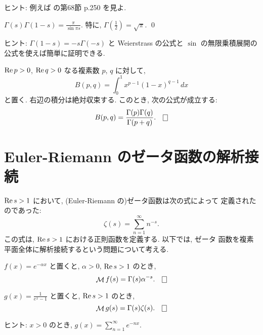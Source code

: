 \documentclass[12pt,twoside]{jarticle}
\begin{document}
\noindent ヒント: 例えば \cite{kaiseki-gairon}の第68節 p.250 を見よ. 

\begin{question}
\label{q:Gamma-and-Sin}
  \(
  \displaystyle
    \Gamma(s)\Gamma(1-s) = \frac{\pi}{\sin \pi s}.
  \)
  \quad
  特に, 
  \(
  \displaystyle
    \Gamma\left( \frac{1}{2} \right) = \sqrt{\pi}.
  \)
  \qed
\end{question}

\noindent ヒント: $\Gamma(1-s)=-s\Gamma(-s)$ と Weierstrass の公式と 
$\sin$ の無限乗積展開の公式を使えば簡単に証明できる.

\begin{question}[ベータ函数との関係]
  $\mathop{\mathrm{Re}}\nolimits p > 0$, $\mathop{\mathrm{Re}}\nolimits q > 0$ なる複素数 $p$, $q$ に対して,
  \[
    B(p,q) = \int_0^1 x^{p-1} (1-x)^{q-1}\,dx
  \]%
と置く. 右辺の積分は絶対収束する. このとき, 次の公式が成立する:
  \[
    B(p,q) = \frac{\Gamma(p)\Gamma(q)}{\Gamma(p+q)}.
  \qed
  \]
\end{question}


\section{Euler-Riemann のゼータ函数の解析接続}

$\mathop{\mathrm{Re}}\nolimits s > 1$ において, (Euler-Riemann の)ゼータ函数は次の式によって
定義されたのであった:
\[
  \zeta(s)
  = \sum_{n=1}^\infty n^{-s}. 
\]%
この式は, $\mathop{\mathrm{Re}}\nolimits s > 1$ における正則函数を定義する. 以下では, ゼータ
函数を複素平面全体に解析接続するという問題について考える.

\begin{question}\label{q:Mellin-exp}
  $f(x) = e^{- \alpha x}$ と置くと,
  $\alpha > 0$, $\mathop{\mathrm{Re}}\nolimits s > 1$ のとき, 
  \[
    \Mellin f(s) = \Gamma(s) \alpha^{-s}.
  \qed
  \]
\end{question}

\begin{question}
  $\displaystyle g(x) = \frac{1}{e^x - 1}$ と置くと,
  $\mathop{\mathrm{Re}}\nolimits s > 1$ のとき, 
  \[
    \Mellin g(s) = \Gamma(s) \zeta(s).
  \qed
  \]
\end{question}

\noindent ヒント: $x > 0$ のとき, $g(x) = \sum_{n=1}^\infty e^{-nx}$.
\end{document}
